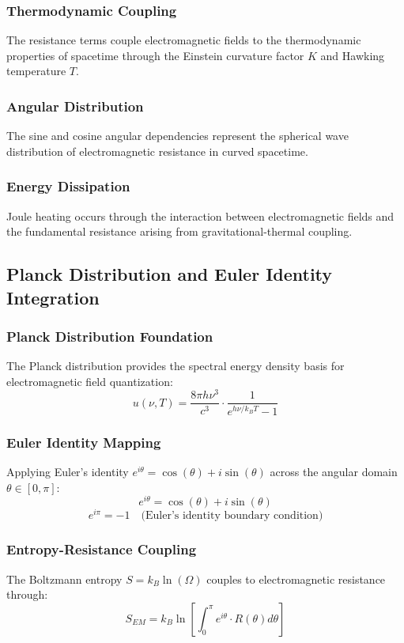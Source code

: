 ﻿\documentclass[12pt]{article}
\begin{document}
\subsubsection{Thermodynamic Coupling}
The resistance terms couple electromagnetic fields to the thermodynamic properties of spacetime through the Einstein curvature factor $K$ and Hawking temperature $T$.

\subsubsection{Angular Distribution}
The sine and cosine angular dependencies represent the spherical wave distribution of electromagnetic resistance in curved spacetime.

\subsubsection{Energy Dissipation}
Joule heating occurs through the interaction between electromagnetic fields and the fundamental resistance arising from gravitational-thermal coupling.

\subsection{Planck Distribution and Euler Identity Integration}

\subsubsection{Planck Distribution Foundation}
The Planck distribution provides the spectral energy density basis for electromagnetic field quantization:
$$u(\nu,T) = \frac{8\pi h\nu^3}{c^3} \cdot \frac{1}{e^{h\nu/k_BT} - 1}$$

\subsubsection{Euler Identity Mapping}
Applying Euler's identity $e^{i\theta} = \cos(\theta) + i\sin(\theta)$ across the angular domain $\theta \in [0,\pi]$:
$$e^{i\theta} = \cos(\theta) + i\sin(\theta)$$
$$e^{i\pi} = -1 \quad \text{(Euler's identity boundary condition)}$$

\subsubsection{Entropy-Resistance Coupling}
The Boltzmann entropy $S = k_B \ln(\Omega)$ couples to electromagnetic resistance through:
$$S_{EM} = k_B \ln\left[\int_0^\pi e^{i\theta}\cdot R(\theta)d\theta\right]$$
\end{document}
